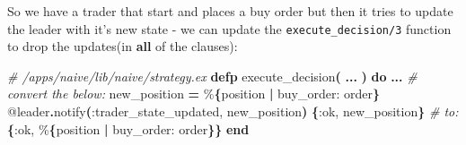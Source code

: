 \documentclass[
  oneside]{book}
\newenvironment{Shaded}{\begin{snugshade}}{\end{snugshade}}
\newcommand{\AttributeTok}[1]{\textcolor[rgb]{0.13,0.29,0.53}{#1}}
\newcommand{\BuiltInTok}[1]{#1}
\newcommand{\CommentTok}[1]{\textcolor[rgb]{0.56,0.35,0.01}{\textit{#1}}}
\newcommand{\ErrorTok}[1]{\textcolor[rgb]{0.64,0.00,0.00}{\textbf{#1}}}
\newcommand{\ExtensionTok}[1]{#1}
\newcommand{\FunctionTok}[1]{\textcolor[rgb]{0.13,0.29,0.53}{\textbf{#1}}}
\newcommand{\KeywordTok}[1]{\textcolor[rgb]{0.13,0.29,0.53}{\textbf{#1}}}
\newcommand{\NormalTok}[1]{#1}
\newcommand{\OperatorTok}[1]{\textcolor[rgb]{0.81,0.36,0.00}{\textbf{#1}}}
\newcommand{\OtherTok}[1]{\textcolor[rgb]{0.56,0.35,0.01}{#1}}
\newcommand{\PreprocessorTok}[1]{\textcolor[rgb]{0.56,0.35,0.01}{\textit{#1}}}
\newcommand{\SpecialStringTok}[1]{\textcolor[rgb]{0.31,0.60,0.02}{#1}}
\newcommand{\StringTok}[1]{\textcolor[rgb]{0.31,0.60,0.02}{#1}}
\newcommand{\VariableTok}[1]{\textcolor[rgb]{0.00,0.00,0.00}{#1}}
\begin{document}
\begin{Shaded}
\end{Shaded}

So we have a trader that start and places a buy order but then it tries to update the leader with it's new state - we can update the \texttt{execute\_decision/3} function to drop the updates(in \textbf{all} of the clauses):

\begin{Shaded}
\begin{Highlighting}[]
    \CommentTok{\# /apps/naive/lib/naive/strategy.ex}
  \KeywordTok{defp}\NormalTok{ execute\_decision}\FunctionTok{(}
    \OperatorTok{...}
       \FunctionTok{)} \KeywordTok{do}
    \OperatorTok{...}
    \CommentTok{\# convert the below:}
\NormalTok{    new\_position }\OperatorTok{=}\NormalTok{ \%}\FunctionTok{\{}\NormalTok{position }\OperatorTok{|} \VariableTok{buy\_order:}\NormalTok{ order}\FunctionTok{\}}
    \OtherTok{@leader}\OperatorTok{.}\NormalTok{notify}\FunctionTok{(}\VariableTok{:trader\_state\_updated}\NormalTok{, new\_position}\FunctionTok{)}
    \FunctionTok{\{}\VariableTok{:ok}\NormalTok{, new\_position}\FunctionTok{\}}
    \CommentTok{\# to:}
    \FunctionTok{\{}\VariableTok{:ok}\NormalTok{, \%}\FunctionTok{\{}\NormalTok{position }\OperatorTok{|} \VariableTok{buy\_order:}\NormalTok{ order}\FunctionTok{\}\}}
  \KeywordTok{end}
\end{Highlighting}
\end{Shaded}
\end{document}
